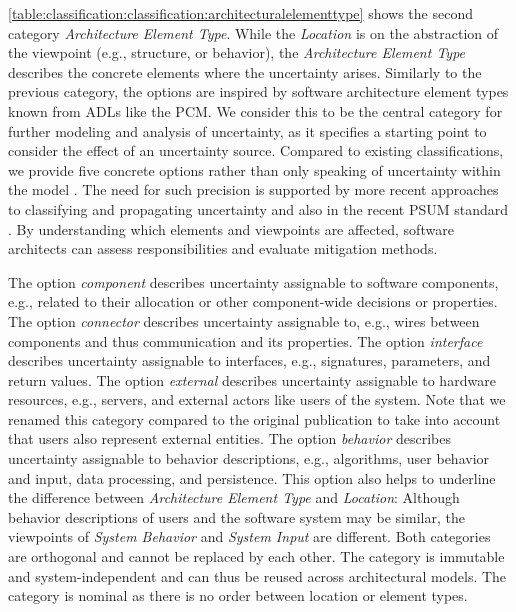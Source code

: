 \autoref{table:classification:classification:architecturalelementtype} shows the second category \emph{Architecture Element Type}.
While the \emph{Location} is on the abstraction of the viewpoint (e.g., structure, or behavior), the \emph{Architecture Element Type} describes the concrete elements where the uncertainty arises.
Similarly to the previous category, the options are inspired by software architecture element types known from \acp{ADL} like the \ac{PCM}.
We consider this to be the central category for further modeling and analysis of uncertainty, as it specifies a starting point to consider the effect of an uncertainty source.
Compared to existing classifications, we provide five concrete options rather than only speaking of uncertainty within the model \cite{perez-palacin_uncertainties_2014}.
The need for such precision is supported by more recent approaches to classifying and propagating uncertainty \cite{acosta_uncertainty_2022,camara_uncertainty_2024} and also in the recent \ac{PSUM} standard \cite{PSUM}.
By understanding which elements and viewpoints are affected, software architects can assess responsibilities and evaluate mitigation methods.

The option \emph{component} describes uncertainty assignable to software components, e.g., related to their allocation or other component-wide decisions or properties.
The option \emph{connector} describes uncertainty assignable to, e.g., wires between components and thus communication and its properties.
The option \emph{interface} describes uncertainty assignable to interfaces, e.g., signatures, parameters, and return values.
The option \emph{external} describes uncertainty assignable to hardware resources, e.g., servers, and external actors like users of the system.
Note that we renamed this category compared to the original publication \cite{hahner_classification_2023} to take into account that users also represent external entities.
The option \emph{behavior} describes uncertainty assignable to behavior descriptions, e.g., algorithms, user behavior and input, data processing, and persistence.
This option also helps to underline the difference between \emph{Architecture Element Type} and \emph{Location}: Although behavior descriptions of users and the software system may be similar, the viewpoints of \emph{System Behavior} and \emph{System Input} are different.
Both categories are orthogonal and cannot be replaced by each other.
The category is immutable and system-independent and can thus be reused across architectural models.
The category is nominal as there is no order between location or element types.


